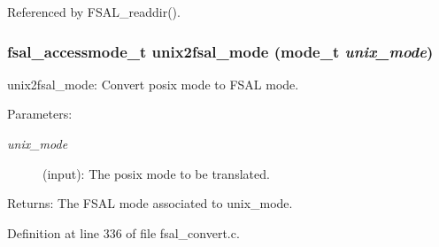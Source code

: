 Referenced by FSAL\_\-readdir().
\subsubsection[{unix2fsal\_\-mode}]{\setlength{\rightskip}{0pt plus 5cm}fsal\_\-accessmode\_\-t unix2fsal\_\-mode (mode\_\-t {\em unix\_\-mode})}\label{fsal__convert_8c_af1ff789aff0ed7114b8e525e01e268c}


unix2fsal\_\-mode: Convert posix mode to FSAL mode.

\begin{Desc}
\item[Parameters:]
\begin{description}
\item[{\em unix\_\-mode}](input): The posix mode to be translated.\end{description}
\end{Desc}
\begin{Desc}
\item[Returns:]The FSAL mode associated to unix\_\-mode. \end{Desc}


Definition at line 336 of file fsal\_\-convert.c.